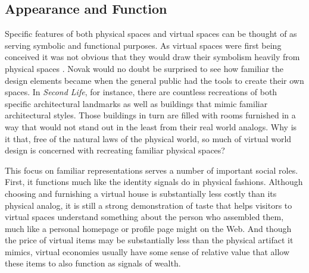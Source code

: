 \subsection{Appearance and Function}
Specific features of both physical spaces and virtual spaces can be thought of as serving symbolic and functional purposes. As virtual spaces were first being conceived it was not obvious that they would draw their symbolism heavily from physical spaces \citep{Novak:1991ue}. Novak would no doubt be surprised to see how familiar the design elements became when the general public had the tools to create their own spaces. In \emph{Second Life}, for instance, there are countless recreations of both specific architectural landmarks as well as buildings that mimic familiar architectural styles. Those buildings in turn are filled with rooms furnished in a way that would not stand out in the least from their real world analogs. Why is it that, free of the natural laws of the physical world, so much of virtual world design is concerned with recreating familiar physical spaces? 

This focus on familiar representations serves a number of important social roles. First, it functions much like the identity signals do in physical fashions. Although choosing and furnishing a virtual house is substantially less costly than its physical analog, it is still a strong demonstration of taste that helps visitors to virtual spaces understand something about the person who assembled them, much like a personal homepage or profile page might on the Web. And though the price of virtual items may be substantially less than the physical artifact it mimics, virtual economies usually have some sense of relative value that allow these items to also function as signals of wealth.

